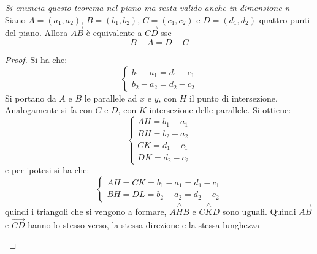 \documentclass[a4paper,12pt, oneside]{book}
\begin{document}
\newpage
\begin{teorema}
	\textit{Si enuncia questo teorema nel piano ma resta valido anche in dimensione n}\\
	Siano $A=(a_1,a_2)$, $B=(b_1,b_2)$, $C=(c_1,c_2)$ e $D=(d_1,d_2)$ quattro punti del piano. Allora $\vec{AB}$ è equivalente a $\vec{CD}$ sse $$B-A=D-C$$
\end{teorema}
\begin{proof}
	Si ha che:
	$$\begin{cases}
			b_1-a_1=d_1-c_1 \\
			b_2-a_2=d_2-c_2
		\end{cases}$$
	Si portano da $A$ e $B$ le parallele ad $x$ e $y$, con $H$ il punto di intersezione. Analogamente si fa con $C$ e $D$, con $K$ intersezione delle parallele. Si ottiene:
	$$\begin{cases}
			AH=b_1-a_1 \\
			BH=b_2-a_2 \\
			CK=d_1-c_1 \\
			DK=d_2-c_2
		\end{cases}$$
	e per ipotesi si ha che:
	$$\begin{cases}
			AH=CK=b_1-a_1=d_1-c_1 \\
			BH=DL=b_2-a_2=d_2-c_2
		\end{cases}$$
	quindi i triangoli che si vengono a formare, $A\overset{\triangle}{H}B$ e $C\overset{\triangle}{K}D$ sono uguali. Quindi $\vec{AB}$ e $\vec{CD}$ hanno lo stesso verso, la stessa direzione e la stessa lunghezza
	\begin{center}


\end{center}
\end{proof}
\end{document}

